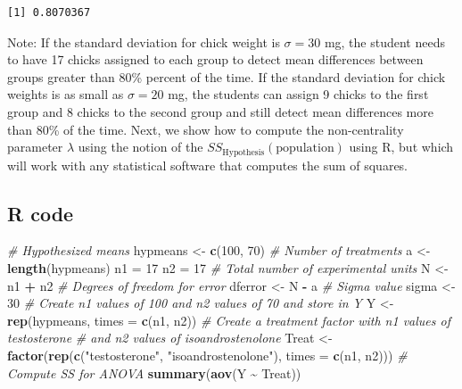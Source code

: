 \documentclass[
]{article}
\newenvironment{Shaded}{\begin{snugshade}}{\end{snugshade}}
\newcommand{\AttributeTok}[1]{\textcolor[rgb]{0.13,0.29,0.53}{#1}}
\newcommand{\CommentTok}[1]{\textcolor[rgb]{0.56,0.35,0.01}{\textit{#1}}}
\newcommand{\DecValTok}[1]{\textcolor[rgb]{0.00,0.00,0.81}{#1}}
\newcommand{\FunctionTok}[1]{\textcolor[rgb]{0.13,0.29,0.53}{\textbf{#1}}}
\newcommand{\NormalTok}[1]{#1}
\newcommand{\OtherTok}[1]{\textcolor[rgb]{0.56,0.35,0.01}{#1}}
\newcommand{\SpecialCharTok}[1]{\textcolor[rgb]{0.81,0.36,0.00}{\textbf{#1}}}
\newcommand{\StringTok}[1]{\textcolor[rgb]{0.31,0.60,0.02}{#1}}
\begin{document}
\begin{verbatim}
[1] 0.8070367
\end{verbatim}

Note: If the standard deviation for chick weight is \(\sigma = 30\) mg, the student needs to have 17 chicks assigned to each group to detect mean differences between groups greater than 80\% percent of the time. If the standard deviation for chick weights is as small as \(\sigma = 20\) mg, the students can assign 9 chicks to the first group and 8 chicks to the second group and still detect mean differences more than 80\% of the time. Next, we show how to compute the non-centrality parameter \(\lambda\) using the notion of the \(SS_\text{Hypothesis}(\text{population})\) using R, but which will work with any statistical software that computes the sum of squares.

\hypertarget{r-code-3}{%
\subsection*{R code}\label{r-code-3}}

\begin{Shaded}
\begin{Highlighting}[]
\CommentTok{\# Hypothesized means}
\NormalTok{hypmeans }\OtherTok{\textless{}{-}} \FunctionTok{c}\NormalTok{(}\DecValTok{100}\NormalTok{, }\DecValTok{70}\NormalTok{)}
\CommentTok{\# Number of treatments}
\NormalTok{a }\OtherTok{\textless{}{-}} \FunctionTok{length}\NormalTok{(hypmeans) }
\NormalTok{n1 }\OtherTok{=} \DecValTok{17}
\NormalTok{n2 }\OtherTok{=} \DecValTok{17}
\CommentTok{\# Total number of experimental units}
\NormalTok{N }\OtherTok{\textless{}{-}}\NormalTok{ n1 }\SpecialCharTok{+}\NormalTok{ n2 }
\CommentTok{\# Degrees of freedom for error}
\NormalTok{dferror }\OtherTok{\textless{}{-}}\NormalTok{ N }\SpecialCharTok{{-}}\NormalTok{ a}
\CommentTok{\# Sigma value}
\NormalTok{sigma }\OtherTok{\textless{}{-}} \DecValTok{30}
\CommentTok{\# Create n1 values of 100 and n2 values of 70 and store in Y}
\NormalTok{Y }\OtherTok{\textless{}{-}} \FunctionTok{rep}\NormalTok{(hypmeans, }\AttributeTok{times =} \FunctionTok{c}\NormalTok{(n1, n2))}
\CommentTok{\# Create a treatment factor with n1 values of testosterone }
\CommentTok{\# and n2 values of isoandrostenolone}
\NormalTok{Treat }\OtherTok{\textless{}{-}} \FunctionTok{factor}\NormalTok{(}\FunctionTok{rep}\NormalTok{(}\FunctionTok{c}\NormalTok{(}\StringTok{"testosterone"}\NormalTok{, }\StringTok{"isoandrostenolone"}\NormalTok{), }
                    \AttributeTok{times =} \FunctionTok{c}\NormalTok{(n1, n2)))}
\CommentTok{\# Compute SS for ANOVA}
\FunctionTok{summary}\NormalTok{(}\FunctionTok{aov}\NormalTok{(Y }\SpecialCharTok{\textasciitilde{}}\NormalTok{ Treat))}
\end{Highlighting}
\end{Shaded}
\end{document}
